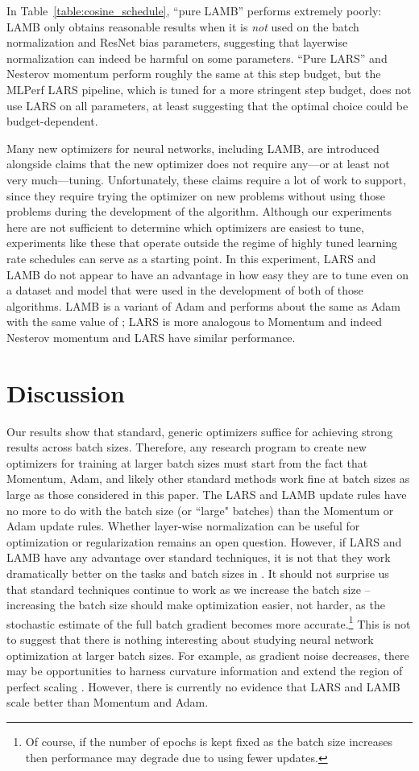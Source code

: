 \documentclass{article}
\begin{document}
In Table~\ref{table:cosine_schedule}, ``pure LAMB'' performs extremely poorly: LAMB only obtains reasonable results when it is \textit{not} used on the batch normalization and ResNet bias parameters, suggesting that layerwise normalization can indeed be harmful on some parameters. ``Pure LARS'' and Nesterov momentum perform roughly the same at this step budget, but the MLPerf LARS pipeline, which is tuned for a more stringent step budget, does not use LARS on all parameters, at least suggesting that the optimal choice could be budget-dependent.


Many new optimizers for neural networks, including LAMB, are introduced alongside claims that the new optimizer does not require any---or at least not very much---tuning. Unfortunately, these claims require a lot of work to support, since they require trying the optimizer on new problems without using those problems during the development of the algorithm. Although our experiments here are not sufficient to determine which optimizers are easiest to tune, experiments like these that operate outside the regime of highly tuned learning rate schedules can serve as a starting point.
In this experiment, LARS and LAMB do not appear to have an advantage in how easy they are to tune even on a dataset and model that were used in the development of both of those algorithms. LAMB is a variant of Adam and performs about the same as Adam with the same value of ; LARS is more analogous to Momentum and indeed Nesterov momentum and LARS have similar performance.
 \section{Discussion}\label{sec:discussion}

Our results show that standard, generic optimizers suffice for achieving strong results across batch sizes.
Therefore, any research program to create new optimizers for training at larger batch sizes must start from the fact that Momentum, Adam, and likely other standard methods work fine at batch sizes as large as those considered in this paper.
The LARS and LAMB update rules have no more to do with the batch size (or ``large" batches) than the Momentum or Adam update rules. Whether layer-wise normalization can be useful for optimization or regularization remains an open question. However, if LARS and LAMB have any advantage over standard techniques, it is not that they work dramatically better on the tasks and batch sizes in \citet{you2017lars,you2019lamb}.
It should not surprise us that standard techniques continue to work as we increase the batch size -- increasing the batch size should make optimization easier, not harder, as the stochastic estimate of the full batch gradient becomes more accurate.\footnote{Of course, if the number of epochs is kept fixed as the batch size increases then performance may degrade due to using fewer updates.} This is not to suggest that there is nothing interesting about studying neural network optimization at larger batch sizes. For example, as gradient noise decreases, there may be opportunities to harness curvature information and extend the region of perfect scaling \citep{zhang2019algorithmic}. However, there is currently no evidence that LARS and LAMB scale better than Momentum and Adam.
\end{document}
